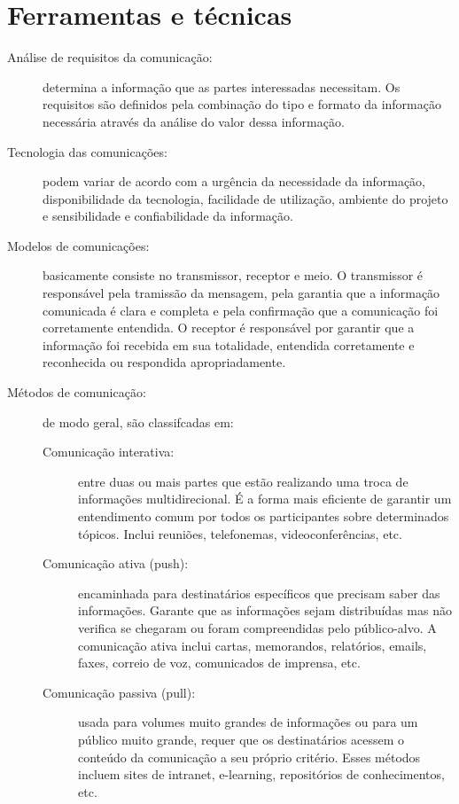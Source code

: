 \section{Ferramentas e técnicas}

\begin{description}

	\item[Análise de requisitos da comunicação:] determina a informação que as partes interessadas necessitam. Os requisitos são definidos pela combinação do tipo e formato da informação necessária através da análise do valor dessa informação.
	
	\item[Tecnologia das comunicações:] podem variar de acordo com a urgência da necessidade da informação, disponibilidade da tecnologia, facilidade de utilização, ambiente do projeto e sensibilidade e confiabilidade da informação.
	
	\item[Modelos de comunicações:] basicamente consiste no transmissor, receptor e meio. O transmissor é responsável pela tramissão da mensagem, pela garantia que a informação comunicada é clara e completa e pela confirmação que a comunicação foi corretamente entendida. O receptor é responsável por garantir que a informação foi recebida em sua totalidade, entendida corretamente e reconhecida ou respondida apropriadamente.
	
	\item[Métodos de comunicação:] de modo geral, são classifcadas em:
	
		\begin{description}
			
			\item[Comunicação interativa:] entre duas ou mais partes que estão realizando uma troca de informações multidirecional. É a forma mais eficiente de garantir um entendimento comum por todos os participantes sobre determinados tópicos. Inclui reuniões, telefonemas, videoconferências, etc.
			
			\item[Comunicação ativa (push):] encaminhada para destinatários específicos que precisam saber das informações. Garante que as informações sejam distribuídas mas não verifica se chegaram ou foram compreendidas pelo público-alvo. A comunicação ativa inclui cartas, memorandos, relatórios, emails, faxes, correio de voz, comunicados de imprensa, etc.
			
			\item[Comunicação passiva (pull):] usada para volumes muito grandes de informações ou para um público muito grande, requer que os destinatários acessem o conteúdo da comunicação a seu próprio critério. Esses métodos incluem sites de intranet, e-learning, repositórios de conhecimentos, etc.


\end{description}
\end{description}
